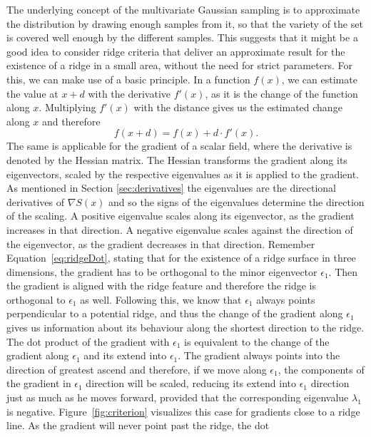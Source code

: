The underlying concept of the multivariate Gaussian sampling is to
approximate the distribution by drawing enough samples from it, so that
the variety of the set is covered well enough by the different samples.
This suggests that it might be a good idea to consider ridge criteria
that deliver an approximate result for the existence of a ridge in a
small area, without the need for strict parameters. For this, we can make
use of a basic principle. In a function $f(x)$, we can estimate the value
at $x + d$ with the derivative $f'(x)$, as it is the change of the
function along $x$. Multiplying $f'(x)$ with the distance gives us the
estimated change along $x$ and therefore
\begin{equation}
    f(x + d) = f(x) + d \cdot f'(x).
\end{equation}
The same is applicable for the gradient of a scalar field, where the
derivative is denoted by the Hessian matrix. The Hessian transforms the
gradient along its eigenvectors, scaled by the respective eigenvalues as
it is applied to the gradient. As mentioned in Section
\ref{sec:derivatives} the eigenvalues are the directional derivatives of
$\nabla S(x)$ and so the signs of the eigenvalues determine the direction
of the scaling. A positive eigenvalue scales along its eigenvector, as
the gradient increases in that direction. A negative eigenvalue scales
against the direction of the eigenvector, as the gradient decreases in
that direction. Remember Equation~\ref{eq:ridgeDot}, stating that for
the existence of a ridge surface in three dimensions, the gradient has
to be orthogonal to the minor eigenvector $\epsilon_1$. Then the
gradient is aligned with the ridge feature and therefore the ridge is
orthogonal to $\epsilon_1$ as well. Following this, we know that
$\epsilon_1$ always points perpendicular to a potential ridge, and thus
the change of the gradient along $\epsilon_1$ gives us information about
its behaviour along the shortest direction to the ridge. The dot product
of the gradient with $\epsilon_1$ is equivalent to the change of the
gradient along $\epsilon_1$ and its extend into $\epsilon_1$. The
gradient always points into the direction of greatest ascend and
therefore, if we move along $\epsilon_1$, the components of the gradient
in $\epsilon_1$ direction will be scaled, reducing its extend into
$\epsilon_1$ direction just as much as he moves forward, provided that
the corresponding eigenvalue $\lambda_1$ is negative.
Figure~\ref{fig:criterion} visualizes this case for gradients close to a
ridge line. As the gradient will never point past the ridge, the dot
